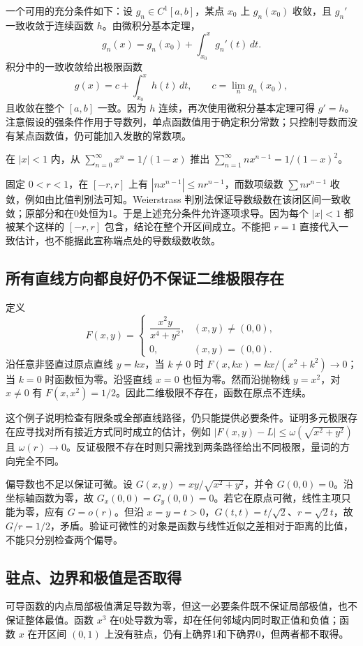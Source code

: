 \documentclass[12pt,fontset=fandol]{ctexart}
\begin{document}
一个可用的充分条件如下：设 $g_n\in C^1[a,b]$，某点 $x_0$ 上 $g_n(x_0)$ 收敛，且 $g_n'$ 一致收敛于连续函数 $h$。由微积分基本定理，
\[
 g_n(x)=g_n(x_0)+\int_{x_0}^xg_n'(t)\,dt.
\]
积分中的一致收敛给出极限函数
\[
 g(x)=c+\int_{x_0}^xh(t)\,dt,
 \qquad c=\lim_ng_n(x_0),
\]
且收敛在整个 $[a,b]$ 一致。因为 $h$ 连续，再次使用微积分基本定理可得 $g'=h$。注意假设的强条件作用于导数列，单点函数值用于确定积分常数；只控制导数而没有某点函数值，仍可能加入发散的常数项。

\begin{example}
在 $|x|<1$ 内，从 $\sum_{n=0}^\infty x^n=1/(1-x)$ 推出 $\sum_{n=1}^\infty nx^{n-1}=1/(1-x)^2$。
\end{example}
\begin{solve}
固定 $0<r<1$，在 $[-r,r]$ 上有 $|nx^{n-1}|\leq nr^{n-1}$，而数项级数 $\sum nr^{n-1}$ 收敛，例如由比值判别法可知。Weierstrass 判别法保证导数级数在该闭区间一致收敛；原部分和在0处恒为1。于是上述充分条件允许逐项求导。因为每个 $|x|<1$ 都被某个这样的 $[-r,r]$ 包含，结论在整个开区间成立。不能把 $r=1$ 直接代入一致估计，也不能据此宣称端点处的导数级数收敛。
\end{solve}

\subsection{所有直线方向都良好仍不保证二维极限存在}
定义
\[
 F(x,y)=\begin{cases}\dfrac{x^2y}{x^4+y^2},&(x,y)\ne(0,0),\\0,&(x,y)=(0,0).\end{cases}
\]
沿任意非竖直过原点直线 $y=kx$，当 $k\ne0$ 时 $F(x,kx)=kx/(x^2+k^2)\to0$；当 $k=0$ 时函数恒为零。沿竖直线 $x=0$ 也恒为零。然而沿抛物线 $y=x^2$，对 $x\ne0$ 有 $F(x,x^2)=1/2$。因此二维极限不存在，函数在原点不连续。

这个例子说明检查有限条或全部直线路径，仍只能提供必要条件。证明多元极限存在应寻找对所有接近方式同时成立的估计，例如 $|F(x,y)-L|\leq\omega(\sqrt{x^2+y^2})$ 且 $\omega(r)\to0$。反证极限不存在时则只需找到两条路径给出不同极限，量词的方向完全不同。

偏导数也不足以保证可微。设 $G(x,y)=xy/\sqrt{x^2+y^2}$，并令 $G(0,0)=0$。沿坐标轴函数为零，故 $G_x(0,0)=G_y(0,0)=0$。若它在原点可微，线性主项只能为零，应有 $G=o(r)$。但沿 $x=y=t>0$，$G(t,t)=t/\sqrt2$、$r=\sqrt2t$，故 $G/r=1/2$，矛盾。验证可微性的对象是函数与线性近似之差相对于距离的比值，不能只分别检查两个偏导。

\subsection{驻点、边界和极值是否取得}
可导函数的内点局部极值满足导数为零，但这一必要条件既不保证局部极值，也不保证整体最值。函数 $x^3$ 在0处导数为零，却在任何邻域内同时取正值和负值；函数 $x$ 在开区间 $(0,1)$ 上没有驻点，仍有上确界1和下确界0，但两者都不取得。
\end{document}
